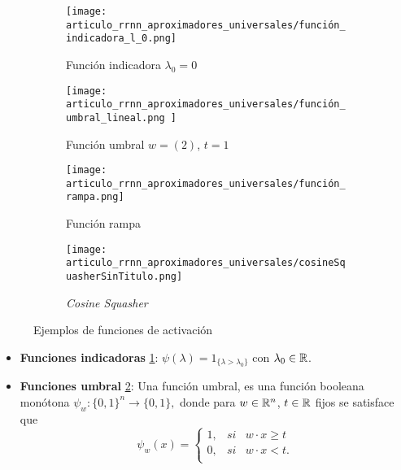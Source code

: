 \begin{definicion}
    \begin{figure}[h]
        \centering
        \begin{subfigure}[t]{0.47\textwidth}
            \centering
            \texttt{[image: 
                articulo\_rrnn\_aproximadores\_universales/función\_indicadora\_l\_0.png]}
            \caption{Función indicadora $\lambda_0 = 0$}  
            \label{fig:función_indicadora}
        \end{subfigure}
        \hfill
        \begin{subfigure}[t]{0.47\textwidth}  
            \centering 
            \texttt{[image: articulo\_rrnn\_aproximadores\_universales/función\_umbral\_lineal.png
            ]}
            \caption{Función umbral $w=(2)$, $t=1$}    
            \label{fig:función_umbral_lineal}
        \end{subfigure}
        \begin{subfigure}[t]{0.47\textwidth}   
            \centering 
            \texttt{[image: articulo\_rrnn\_aproximadores\_universales/función\_rampa.png]}
            \caption{Función rampa} 
            \label{fig:funciones_rampa}
        \end{subfigure}
        \hfill
        \begin{subfigure}[t]{0.47\textwidth}   
            \centering 
            \texttt{[image: articulo\_rrnn\_aproximadores\_universales/cosineSquasherSinTitulo.png]}
            \caption{\textit{Cosine Squasher}}   
            \label{fig:cosine_squasher}
        \end{subfigure}
        \caption{Ejemplos de funciones de activación} 
        \label{fig:EjemplosFunciónActivación}
    \end{figure}

    \begin{itemize}
        \item \textbf{Funciones indicadoras} \ref{fig:función_indicadora}: $\psi(\lambda) = 1_{\{\lambda > \lambda_0\}}$ con $\lambda_0 \in \mathbb{R}$. 
        
        \item \textbf{Funciones umbral} \ref{fig:función_umbral_lineal}:
        Una función umbral, es una función booleana monótona $\psi_w: \{0,1\}^n \longrightarrow \{0,1\},$ 
        donde para $w \in \mathbb{R}^n$, $t \in \mathbb{R}$ fijos se
        satisface que 
        \begin{equation}
            \psi_w(x) = \left\{
                \begin{array}{lcc}
                    1, &   si  & w \cdot x \geq t \\
                    0, &  si & w \cdot x < t.\\
                    \end{array}
            \right.
        \end{equation}
        

\end{itemize}
\end{definicion}
